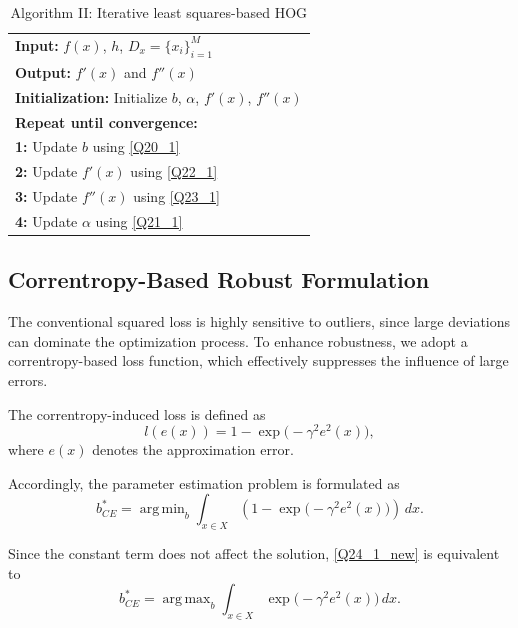 \documentclass{elsarticle}
\DeclareMathOperator*{\argmax}{arg\,max}
\DeclareMathOperator*{\argmin}{arg\,min}
\begin{document}
\begin{table}[t]
	\centering
	\caption{Algorithm II: Iterative least squares-based HOG}
	\label{my-labelII}
	
	\begin{tabular}{l}
		\hline
		\textbf{Input:} $f(x)$, $h$, $D_x=\{x_i\}_{i=1}^{M}$\\
		\textbf{Output:} $f'(x)$ and $f''(x)$\\
		\textbf{Initialization:} Initialize $b$, $\alpha$, $f'(x)$, $f''(x)$\\
		\hline
		\textbf{Repeat until convergence:}\\
		\textbf{1:} Update $b$ using \eqref{Q20_1}\\
		\textbf{2:} Update $f'(x)$ using \eqref{Q22_1}\\
		\textbf{3:} Update $f''(x)$ using \eqref{Q23_1}\\
		\textbf{4:} Update $\alpha$ using \eqref{Q21_1}\\
		\hline
	\end{tabular}
	
\end{table}

\subsection{Correntropy-Based Robust Formulation}

The conventional squared loss is highly sensitive to outliers, since large deviations can dominate the optimization process. To enhance robustness, we adopt a correntropy-based loss function, which effectively suppresses the influence of large errors.

The correntropy-induced loss is defined as
\begin{equation}
	l(e(x)) = 1 - \exp\big(-\gamma^2 e^2(x)\big),
\end{equation}
where $e(x)$ denotes the approximation error.

Accordingly, the parameter estimation problem is formulated as
\begin{equation}\label{Q24_1_new}
	b^*_{CE} =
	\argmin_{b}
	\int_{x \in X}
	\left(1 - \exp\big(-\gamma^2 e^2(x)\big)\right)\, dx.
\end{equation}

Since the constant term does not affect the solution, \eqref{Q24_1_new} is equivalent to
\begin{equation}\label{Q25_1_new}
	b^*_{CE} =
	\argmax_{b}
	\int_{x \in X}
	\exp\big(-\gamma^2 e^2(x)\big)\, dx.
\end{equation}
\end{document}
